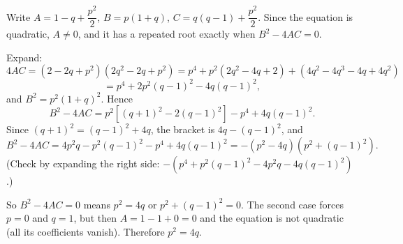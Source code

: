 Write $A=1-q+\dfrac{p^2}{2}$, $B=p(1+q)$, $C=q(q-1)+\dfrac{p^2}{2}$. Since the equation is quadratic, $A\ne0$, and it has a repeated root exactly when $B^2-4AC=0$.

Expand:
\[
4AC=\left(2-2q+p^2\right)\left(2q^2-2q+p^2\right)
=p^4+p^2\left(2q^2-4q+2\right)+\left(4q^2-4q^3-4q+4q^2\right)
\]
\[
=p^4+2p^2(q-1)^2-4q(q-1)^2 ,
\]
and $B^2=p^2(1+q)^2$. Hence
\[
B^2-4AC=p^2\left[(q+1)^2-2(q-1)^2\right]-p^4+4q(q-1)^2 .
\]
Since $(q+1)^2=(q-1)^2+4q$, the bracket is $4q-(q-1)^2$, and
\[
B^2-4AC=4p^2q-p^2(q-1)^2-p^4+4q(q-1)^2=-\left(p^2-4q\right)\left(p^2+(q-1)^2\right).
\]
(Check by expanding the right side: $-\left(p^4+p^2(q-1)^2-4p^2q-4q(q-1)^2\right)$.)

So $B^2-4AC=0$ means $p^2=4q$ or $p^2+(q-1)^2=0$. The second case forces $p=0$ and $q=1$, but then $A=1-1+0=0$ and the equation is not quadratic (all its coefficients vanish). Therefore $\boxed{p^2=4q}$.
